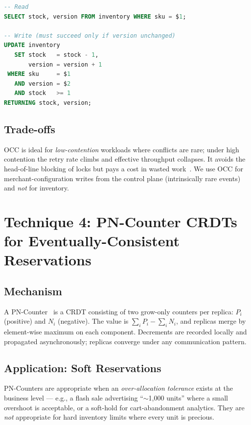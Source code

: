 \documentclass[12pt,a4paper,oneside]{report}
\begin{document}
\begin{lstlisting}[language=SQL, caption=Versioned conditional update (PostgreSQL)]
-- Read
SELECT stock, version FROM inventory WHERE sku = $1;

-- Write (must succeed only if version unchanged)
UPDATE inventory
   SET stock   = stock - 1,
       version = version + 1
 WHERE sku     = $1
   AND version = $2
   AND stock   >= 1
RETURNING stock, version;
\end{lstlisting}

\subsection{Trade-offs}
OCC is ideal for \emph{low-contention} workloads where conflicts are rare; under high contention the retry rate climbs and effective throughput collapses. It avoids the head-of-line blocking of locks but pays a cost in wasted work~\cite{wang2024optiql, zhou2025ccaas}. We use OCC for merchant-configuration writes from the control plane (intrinsically rare events) and \emph{not} for inventory.

\section[Technique 4: PN-Counter CRDTs]{Technique 4: PN-Counter CRDTs for Eventually-Consistent Reservations}

\subsection{Mechanism}
A PN-Counter~\cite{shapiro2011crdt, duncan2025crdt} is a CRDT consisting of two grow-only counters per replica: $P_i$ (positive) and $N_i$ (negative). The value is $\sum_i P_i - \sum_i N_i$, and replicas merge by element-wise maximum on each component. Decrements are recorded locally and propagated asynchronously; replicas converge under any communication pattern.

\subsection{Application: Soft Reservations}
PN-Counters are appropriate when an \emph{over-allocation tolerance} exists at the business level --- e.g., a flash sale advertising ``$\sim$1{,}000 units'' where a small overshoot is acceptable, or a soft-hold for cart-abandonment analytics. They are \emph{not} appropriate for hard inventory limits where every unit is precious.
\end{document}

